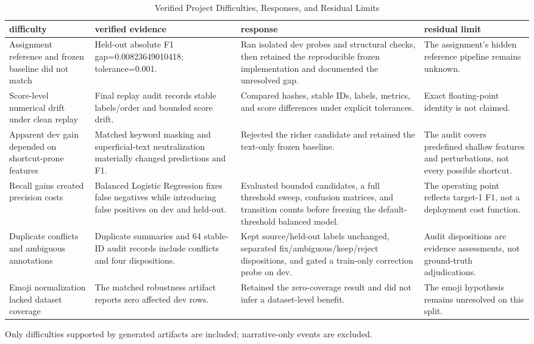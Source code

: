 \begin{table}[t]
\centering
\caption{Verified Project Difficulties, Responses, and Residual Limits}
\label{tab:difficulties}
\scriptsize
\setlength{\tabcolsep}{3pt}
\renewcommand{\arraystretch}{1.08}
\begin{tabular}{@{}p{}p{}p{}p{}@{}}
\hline
\textbf{difficulty} & \textbf{verified evidence} & \textbf{response} & \textbf{residual limit} \\
\hline
Assignment reference and frozen baseline did not match & Held-out absolute F1 gap=0.00823649010418; tolerance=0.001. & Ran isolated dev probes and structural checks, then retained the reproducible frozen implementation and documented the unresolved gap. & The assignment's hidden reference pipeline remains unknown. \\
Score-level numerical drift under clean replay & Final replay audit records stable labels/order and bounded score drift. & Compared hashes, stable IDs, labels, metrics, and score differences under explicit tolerances. & Exact floating-point identity is not claimed. \\
Apparent dev gain depended on shortcut-prone features & Matched keyword masking and superficial-text neutralization materially changed predictions and F1. & Rejected the richer candidate and retained the text-only frozen baseline. & The audit covers predefined shallow features and perturbations, not every possible shortcut. \\
Recall gains created precision costs & Balanced Logistic Regression fixes false negatives while introducing false positives on dev and held-out. & Evaluated bounded candidates, a full threshold sweep, confusion matrices, and transition counts before freezing the default-threshold balanced model. & The operating point reflects target-1 F1, not a deployment cost function. \\
Duplicate conflicts and ambiguous annotations & Duplicate summaries and 64 stable-ID audit records include conflicts and four dispositions. & Kept source/held-out labels unchanged, separated fix/ambiguous/keep/reject dispositions, and gated a train-only correction probe on dev. & Audit dispositions are evidence assessments, not ground-truth adjudications. \\
Emoji normalization lacked dataset coverage & The matched robustness artifact reports zero affected dev rows. & Retained the zero-coverage result and did not infer a dataset-level benefit. & The emoji hypothesis remains unresolved on this split. \\
\hline
\end{tabular}
\par\footnotesize{Only difficulties supported by generated artifacts are included; narrative-only events are excluded.}
\end{table}
